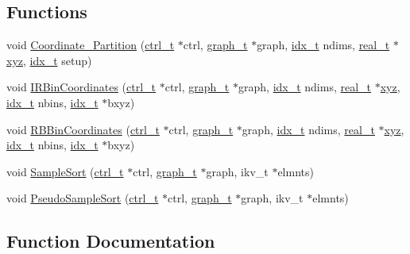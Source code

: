 \subsection*{Functions}
\begin{DoxyCompactItemize}
\item 
void \hyperlink{a00419_ab907c5a6cbed51a1027117aa083dcde0}{Coordinate\+\_\+\+Partition} (\hyperlink{a00742}{ctrl\+\_\+t} $\ast$ctrl, \hyperlink{a00734}{graph\+\_\+t} $\ast$graph, \hyperlink{a00876_aaa5262be3e700770163401acb0150f52}{idx\+\_\+t} ndims, \hyperlink{a00876_a1924a4f6907cc3833213aba1f07fcbe9}{real\+\_\+t} $\ast$\hyperlink{a00614_a6444a221e6b74abaf6d67d44af2650a0}{xyz}, \hyperlink{a00876_aaa5262be3e700770163401acb0150f52}{idx\+\_\+t} setup)
\item 
void \hyperlink{a00419_a868c9811f572c62917c5e8cc22dd92a9}{I\+R\+Bin\+Coordinates} (\hyperlink{a00742}{ctrl\+\_\+t} $\ast$ctrl, \hyperlink{a00734}{graph\+\_\+t} $\ast$graph, \hyperlink{a00876_aaa5262be3e700770163401acb0150f52}{idx\+\_\+t} ndims, \hyperlink{a00876_a1924a4f6907cc3833213aba1f07fcbe9}{real\+\_\+t} $\ast$\hyperlink{a00614_a6444a221e6b74abaf6d67d44af2650a0}{xyz}, \hyperlink{a00876_aaa5262be3e700770163401acb0150f52}{idx\+\_\+t} nbins, \hyperlink{a00876_aaa5262be3e700770163401acb0150f52}{idx\+\_\+t} $\ast$bxyz)
\item 
void \hyperlink{a00419_a7e9cbe6e63b34b8d6e9e7bd03445e4c4}{R\+B\+Bin\+Coordinates} (\hyperlink{a00742}{ctrl\+\_\+t} $\ast$ctrl, \hyperlink{a00734}{graph\+\_\+t} $\ast$graph, \hyperlink{a00876_aaa5262be3e700770163401acb0150f52}{idx\+\_\+t} ndims, \hyperlink{a00876_a1924a4f6907cc3833213aba1f07fcbe9}{real\+\_\+t} $\ast$\hyperlink{a00614_a6444a221e6b74abaf6d67d44af2650a0}{xyz}, \hyperlink{a00876_aaa5262be3e700770163401acb0150f52}{idx\+\_\+t} nbins, \hyperlink{a00876_aaa5262be3e700770163401acb0150f52}{idx\+\_\+t} $\ast$bxyz)
\item 
void \hyperlink{a00419_a2143bf929ebccf74747b328617eb619a}{Sample\+Sort} (\hyperlink{a00742}{ctrl\+\_\+t} $\ast$ctrl, \hyperlink{a00734}{graph\+\_\+t} $\ast$graph, ikv\+\_\+t $\ast$elmnts)
\item 
void \hyperlink{a00419_a2faf7ef22f45b689c53efc937cd67502}{Pseudo\+Sample\+Sort} (\hyperlink{a00742}{ctrl\+\_\+t} $\ast$ctrl, \hyperlink{a00734}{graph\+\_\+t} $\ast$graph, ikv\+\_\+t $\ast$elmnts)
\end{DoxyCompactItemize}


\subsection{Function Documentation}
\mbox{\label{a00419_ab907c5a6cbed51a1027117aa083dcde0}} 

